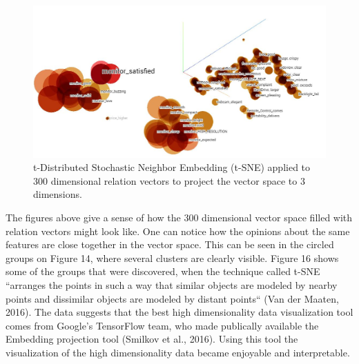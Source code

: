 \documentclass{sig-alternate}
\begin{document}
\begin{figure}
\centering
\includegraphics[scale=0.33]{images/tsne_new.JPG}
\caption{t-Distributed Stochastic Neighbor Embedding (t-SNE) applied to 300 dimensional relation vectors to project the vector space to 3 dimensions.}
\end{figure}

The figures above give a sense of how the 300 dimensional vector space filled with relation vectors might look like. One can notice how the opinions about the same features are close together in the vector space. This can be seen in the circled groups on Figure 14, where several clusters are clearly visible. Figure 16 shows some of the groups that were discovered, when the technique called t-SNE ``arranges the points in such a way that similar objects are modeled by nearby points and dissimilar objects are modeled by distant points``  (Van der Maaten, 2016). The data suggests that the best high dimensionality data visualization tool comes from Google's TensorFlow team, who made publically available the Embedding projection tool (Smilkov et al., 2016). Using this tool the visualization of the high dimensionality data became enjoyable and interpretable. 
\end{document}
